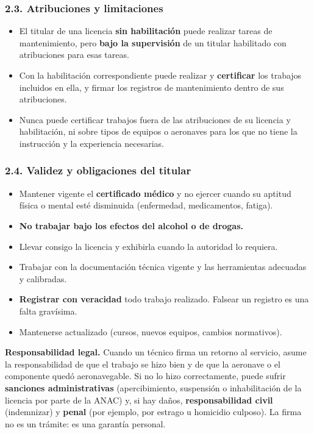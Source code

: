 \subsubsection*{2.3. Atribuciones y limitaciones}
\begin{itemize}
  \item El titular de una licencia \textbf{sin habilitación} puede realizar tareas de
        mantenimiento, pero \textbf{bajo la supervisión} de un titular habilitado con atribuciones
        para esas tareas.
  \item Con la habilitación correspondiente puede realizar y \textbf{certificar} los trabajos
        incluidos en ella, y firmar los registros de mantenimiento dentro de sus atribuciones.
  \item Nunca puede certificar trabajos fuera de las atribuciones de su licencia y habilitación,
        ni sobre tipos de equipos o aeronaves para los que no tiene la instrucción y la experiencia
        necesarias.
\end{itemize}

\subsubsection*{2.4. Validez y obligaciones del titular}
\begin{itemize}
  \item Mantener vigente el \textbf{certificado médico} y no ejercer cuando su aptitud física o
        mental esté disminuida (enfermedad, medicamentos, fatiga).
  \item \textbf{No trabajar bajo los efectos del alcohol o de drogas.}
  \item Llevar consigo la licencia y exhibirla cuando la autoridad lo requiera.
  \item Trabajar con la documentación técnica vigente y las herramientas adecuadas y calibradas.
  \item \textbf{Registrar con veracidad} todo trabajo realizado. Falsear un registro es una falta
        gravísima.
  \item Mantenerse actualizado (cursos, nuevos equipos, cambios normativos).
\end{itemize}

\begin{recuadro}
\textbf{Responsabilidad legal.} Cuando un técnico firma un retorno al servicio, asume la
responsabilidad de que el trabajo se hizo bien y de que la aeronave o el componente quedó
aeronavegable. Si no lo hizo correctamente, puede sufrir \textbf{sanciones administrativas}
(apercibimiento, suspensión o inhabilitación de la licencia por parte de la ANAC) y, si hay daños,
\textbf{responsabilidad civil} (indemnizar) y \textbf{penal} (por ejemplo, por estrago u homicidio
culposo). La firma no es un trámite: es una garantía personal.
\end{recuadro}

